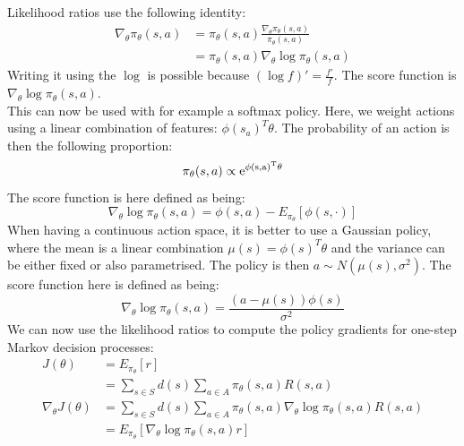 \documentclass[a4paper, 11pt]{article}
\begin{document}
Likelihood ratios use the following identity:
\begin{align}
\nabla_{\theta}\pi_{\theta}(s,a) &= \pi_{\theta}(s,a) \frac{\nabla_{\theta}\pi_{\theta}(s,a)}{\pi_{\theta}(s,a)}\\
&= \pi_{\theta}(s,a) \nabla_{\theta} \log \pi_{\theta}(s,a)
\end{align}
Writing it using the $\log$ is possible because $(\log f)' = \frac{f'}{f}$. The score function is $\nabla_{\theta} \log \pi_{\theta}(s,a)$.\\
This can now be used with for example a softmax policy. Here, we weight actions using a linear combination of features: $\phi(s_a)^T \theta$. The probability of an action is then the following proportion:
\begin{equation}
\pi_{\theta}(s,a) \propto \rm{e}^{\phi(s,a)^T \theta}
\end{equation}
The score function is here defined as being:
\begin{equation}
\nabla_{\theta} \log \pi_{\theta}(s,a) = \phi(s,a) - E_{\pi_{\theta}}[\phi(s,\cdot)]
\end{equation}
When having a continuous action space, it is better to use a Gaussian policy, where the mean is a linear combination $\mu(s) = \phi(s)^T \theta$ and the variance can be either fixed or also parametrised. The policy is then $a \sim N(\mu(s), \sigma^2)$. The score function here is defined as being:
\begin{equation}
\nabla_{\theta} \log \pi_{\theta}(s,a) = \frac{(a-\mu(s))\phi(s)}{\sigma^2}
\end{equation}
We can now use the likelihood ratios to compute the policy gradients for one-step Markov decision processes:
\begin{align}
J(\theta) &= E_{\pi_{\theta}}[r]\\
&= \sum_{s \in S} d(s) \sum_{a \in A} \pi_{\theta}(s,a) R(s,a)\\
\nabla_{\theta} J(\theta) &= \sum_{s \in S} d(s) \sum_{a \in A} \pi_{\theta}(s,a) \nabla_{\theta} \log \pi_{\theta}(s,a) R(s,a)\\
&= E_{\pi_{\theta}} [\nabla_{\theta} \log \pi_{\theta}(s,a)r]
\end{align}
\end{document}
